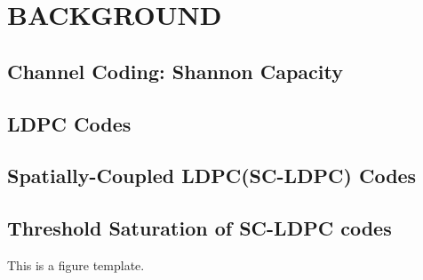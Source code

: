 %
%
%
%



\chapter{BACKGROUND}
\section{Channel Coding: Shannon Capacity}
\section{LDPC Codes}
\section{Spatially-Coupled LDPC(SC-LDPC) Codes}
\section{Threshold Saturation of SC-LDPC codes}
This is a figure template.
